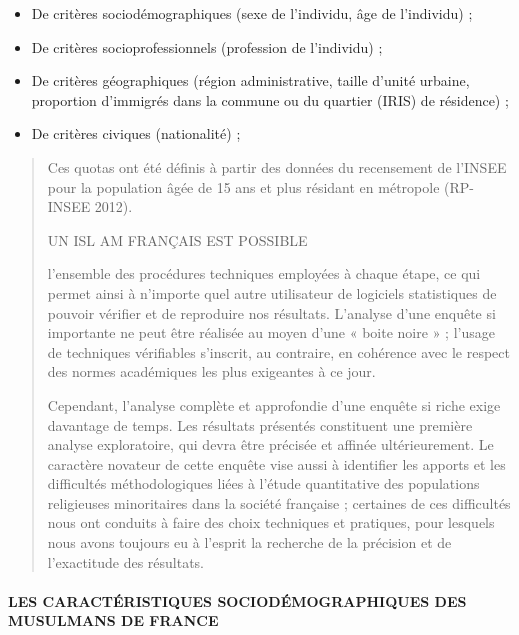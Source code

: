 \begin{itemize}
\item
  De critères sociodémographiques (sexe de l'individu, âge de
  l'individu) ;
\item
  De critères socioprofessionnels (profession de l'individu) ;
\item
  De critères géographiques (région administrative, taille d'unité
  urbaine, proportion d'immigrés dans la commune ou du quartier (IRIS)
  de résidence) ;
\item
  De critères civiques (nationalité) ;
\end{itemize}

\begin{quote}
Ces quotas ont été définis à partir des données du recensement de
l'INSEE pour la population âgée de 15 ans et plus résidant en métropole
(RP-INSEE 2012).

UN ISL AM FRANÇAIS EST POSSIBLE

l'ensemble des procédures techniques employées à chaque étape, ce qui
permet ainsi à n'importe quel autre utilisateur de logiciels
statistiques de pouvoir vérifier et de reproduire nos résultats.
L'analyse d'une enquête si importante ne peut être réalisée au moyen
d'une « boite noire » ; l'usage de techniques vérifiables s'inscrit, au
contraire, en cohérence avec le respect des normes académiques les plus
exigeantes à ce jour.

Cependant, l'analyse complète et approfondie d'une enquête si riche
exige davantage de temps. Les résultats présentés constituent une
première analyse exploratoire, qui devra être précisée et affinée
ultérieurement. Le caractère novateur de cette enquête vise aussi à
identifier les apports et les difficultés méthodologiques liées à
l'étude quantitative des populations religieuses minoritaires dans la
société française ; certaines de ces difficultés nous ont conduits à
faire des choix techniques et pratiques, pour lesquels nous avons
toujours eu à l'esprit la recherche de la précision et de l'exactitude
des résultats.
\end{quote}

\hypertarget{les-caractuxe9ristiques-socioduxe9mographiques-des-musulmans-de-france}{%
\paragraph{LES CARACTÉRISTIQUES SOCIODÉMOGRAPHIQUES DES MUSULMANS DE
FRANCE}\label{les-caractuxe9ristiques-socioduxe9mographiques-des-musulmans-de-france}}

